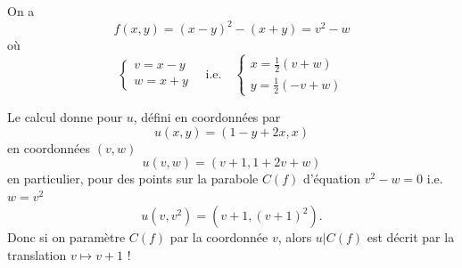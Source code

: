 \documentclass[11pt,a4paper]{article}
\begin{document}
On a
\[
f(x,y) = (x - y)^2 - (x + y) = v^2 - w
\]
où
\[
\begin{cases}
v = x - y \\
w = x + y
\end{cases}
\quad \text{i.e.} \quad
\begin{cases}
x = \frac12(v + w) \\
y = \frac12(-v + w)
\end{cases}
\]


Le calcul donne pour $u$, défini en coordonnées  par
\[
u(x,y) = (1 - y + 2x, x)
\]
en coordonnées $(v,w)$
\[
u(v,w) = (v + 1, 1 + 2v + w)
\]
en particulier, pour des points sur la parabole $C(f)$ d'équation $v^2 - w = 0$ i.e. $w = v^2$
\[
u(v, v^2) = (v + 1, (v+1)^2) .
\]
Donc si on paramètre $C(f)$ par la coordonnée $v$, alors $u|C(f)$ est décrit par la translation $v \mapsto v+1$ !
\end{document}
